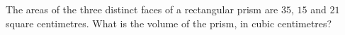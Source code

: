 The areas of the three distinct faces of a rectangular prism are $35$, $15$ and $21$ square centimetres. What is the volume of the prism, in cubic centimetres?

